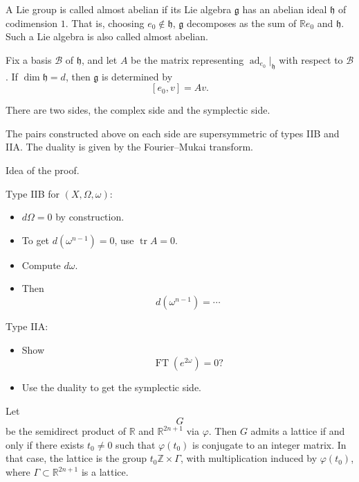 \begin{definition}
\label{definition-almost-abelian}
A Lie group is called almost abelian
if its Lie algebra $\mathfrak{g}$ has
an abelian ideal $\mathfrak{h}$ of
codimension $1$.
That is, choosing
$e_0\notin\mathfrak{h}$,
$\mathfrak{g}$ decomposes as
the sum of $\mathbb{R}e_0$ and
$\mathfrak{h}$.
Such a Lie algebra is also called
almost abelian.

Fix a basis $\mathcal{B}$ of
\(\mathfrak{h}\), and let $A$ be the
matrix representing
\(\operatorname{ad}_{e_0}|_{\mathfrak{h}}\)
with respect to $\mathcal{B}$.
If $\dim \mathfrak{h}=d$, then
\(\mathfrak{g}\) is determined by
$$
[e_0,v]=Av.
$$
\end{definition}

\medskip\noindent
There are two sides, the complex side
and the symplectic side.

\begin{theorem}
\label{theorem-two-sides}
The pairs constructed above on each
side are supersymmetric of types IIB
and IIA.
The duality is given by the
Fourier--Mukai transform.
\end{theorem}

\begin{remark}
\label{remark-proof-idea}
Idea of the proof.

Type IIB for $(X,\Omega,\omega)$:
\begin{itemize}
\item $d\Omega=0$ by construction.
\item To get $d(\omega^{n-1})=0$, use
\(\operatorname{tr} A=0\).
\item Compute $d\omega$.
\item Then
$$
d(\omega^{n-1})=\cdots
$$
\end{itemize}

Type IIA:
\begin{itemize}
\item Show
$$
\operatorname{FT}(e^{2\omega})=0?
$$
\item Use the duality to get the
symplectic side.
\end{itemize}
\end{remark}

\begin{theorem}
\label{theorem-andrada-orfila}
Let
$$
G
$$
be the semidirect product of
\(\mathbb{R}\) and \(\mathbb{R}^{2n+1}\)
via $\varphi$.
Then $G$ admits a lattice if and
only if there exists $t_0\neq 0$ such
that $\varphi(t_0)$ is conjugate to an
integer matrix.
In that case, the lattice is
the group $t_0\mathbb{Z}\times \Gamma$,
with multiplication induced by
$\varphi(t_0)$, where
$\Gamma\subset\mathbb{R}^{2n+1}$
is a lattice.
\end{theorem}

